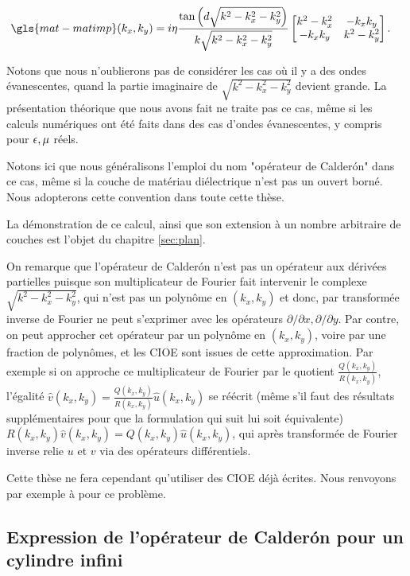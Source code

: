     \begin{align*}
      \gls{mat-matimp}(k_x,k_y) &= i\eta\frac{\tan\left(d\sqrt{k^2-k_x^2-k_y^2}\right)}{k \sqrt{k^2-k_x^2-k_y^2}}
      \begin{bmatrix}
        k^2-k_x^2  & -k_xk_y
        \\
        -k_xk_y & k^2-k_y^2
      \end{bmatrix}.
    \end{align*}

    Notons que nous n'oublierons pas de considérer les cas où il y a des ondes évanescentes, quand la partie imaginaire de \(\sqrt{k^2-k_x^2-k_y^2}\) devient grande.
    La présentation théorique que nous avons fait ne traite pas ce cas, même si les calculs numériques ont été faits dans des cas d'ondes évanescentes, y compris pour \(\epsilon,\mu\) réels.

    Notons ici que nous généralisons l'emploi du nom "opérateur de Calderón" dans ce cas, même si la couche de matériau diélectrique n'est pas un ouvert borné. Nous adopterons cette convention dans toute cette thèse. 
    
    La démonstration de ce calcul, ainsi que son extension à un nombre arbitraire de couches est l'objet du chapitre \ref{sec:plan}.

    On remarque que l'opérateur de Calderón n'est pas un opérateur aux dérivées partielles puisque son multiplicateur de Fourier fait intervenir le complexe \(\sqrt{k^2-k_x^2 - k_y^2}\), qui n'est pas un polynôme en $(k_x,k_y)$ et donc, par transformée inverse de Fourier ne peut s'exprimer avec les opérateurs \(\partial/\partial x, \partial / \partial y\).
    Par contre, on peut approcher cet opérateur par un polynôme en \((k_x,k_y)\), voire par une fraction de polynômes, et les CIOE sont issues de cette approximation.
    Par exemple si on approche ce multiplicateur de Fourier par le quotient \(\frac{Q(k_x,k_y)}{R(k_x,k_y)}\), l'égalité \({\hat v}(k_x,k_y)=\frac{Q(k_x,k_y)}{R(k_x,k_y)}{\hat u}(k_x,k_y)\) se réécrit (même s'il faut des résultats supplémentaires pour que la formulation qui suit lui soit équivalente) \(R(k_x,k_y){\hat v}(k_x,k_y)=Q(k_x,k_y){\hat u}(k_x,k_y)\), qui après transformée de Fourier inverse relie \(u\) et \(v\) via des opérateurs différentiels.

    Cette thèse ne fera cependant qu'utiliser des CIOE déjà écrites.
    Nous renvoyons par exemple à \cite{senior_approximate_1995} pour ce problème.

  \subsection{Expression de l'opérateur de Calderón pour un cylindre infini}


